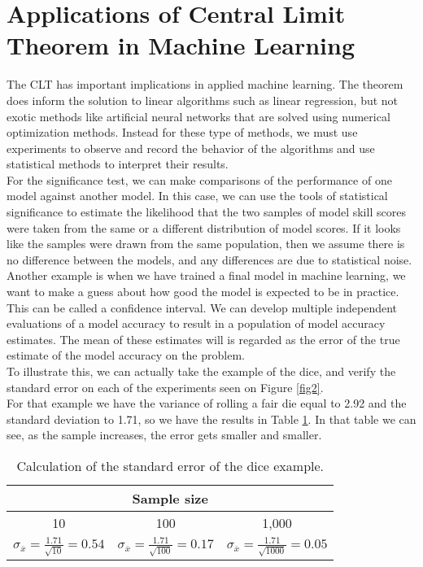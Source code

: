 \documentclass{article}
\begin{document}
\section{Applications of Central Limit Theorem in Machine Learning}

The CLT has important implications in applied machine learning. The theorem does inform the solution to linear algorithms such as linear regression, but not exotic methods like artificial neural networks that are solved using numerical optimization methods. Instead for these type of methods, we must use experiments to observe and record the behavior of the algorithms and use statistical methods to interpret their results. \\

For the significance test, we can make comparisons of the performance of one model against another model. In this case, we can use the tools of statistical significance to estimate the likelihood that the two samples of model skill scores were taken from the same or a different distribution of model scores. If it looks like the samples were drawn from the same population, then we assume there is no difference between the models, and any differences are due to statistical noise.\\

Another example is when we have trained a final model in machine learning, we want to make a guess about how good the model is expected to be in practice. This can be called a confidence interval. We can develop multiple independent evaluations of a model accuracy to result in a population of model accuracy estimates. The mean of these estimates will is regarded as the error of the true estimate of the model accuracy on the problem.\\

To illustrate this, we can actually take the example of the dice, and verify the standard error on each of the experiments seen on Figure \ref{fig2}.\\

For that example we have the variance of rolling a fair die equal to 2.92 and the standard deviation to 1.71, so we have the results in Table \ref{tab1}. In that table we can see, as the sample increases, the error gets smaller and smaller. \\


\begin{table}[]
\centering
\caption{Calculation of the standard error of the dice example.}\label{tab1}
\begin{tabular}{|c|c|c|}
\toprule
        \multicolumn{3}{|c|}{{{\bfseries Sample size}}} \\
\midrule  
    10      &  100 &    1,000   \\
    \midrule
$\sigma_{\overline{x}} = \frac{1.71}{\sqrt{10}} = 0.54$      &  $\sigma_{\overline{x}} = \frac{1.71}{\sqrt{100}} = 0.17$  &   $\sigma_{\overline{x}} = \frac{1.71}{\sqrt{1000}} = 0.05$    \\
\bottomrule
\end{tabular}
\end{table}
\end{document}
